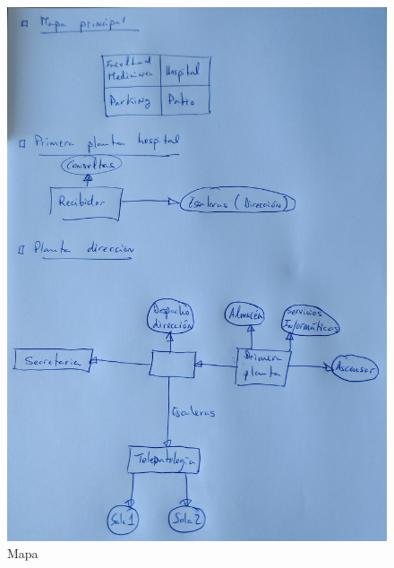 \begin{figure}[h]
	\centering
		\includegraphics[scale=0.7]{./mapa.png}
	\caption{Mapa}
\end{figure}

%
%

       
